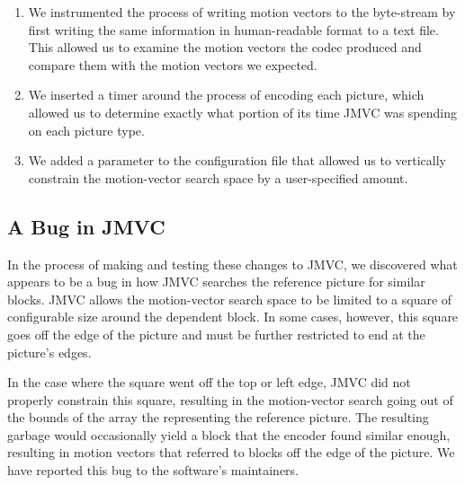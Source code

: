 \documentclass{sig-alternate-05-2015}
\begin{document}
\begin{enumerate}
\item We instrumented the process of writing motion vectors to the byte-stream
by first writing the same information in human-readable format to a text file.
This allowed us to examine the motion vectors the codec produced and compare
them with the motion vectors we expected.

\item We inserted a timer around the process of encoding each picture, which
allowed us to determine exactly what portion of its time JMVC was spending on
each picture type.

\item We added a parameter to the configuration file that allowed us to
vertically constrain the motion-vector search space by a user-specified amount.
\end{enumerate}

\subsection{A Bug in JMVC}
\label{subsec:bug}
In the process of making and testing these changes to JMVC, we discovered what
appears to be a bug in how JMVC searches the reference picture for similar
blocks. JMVC allows the motion-vector search space to be limited to a square of
configurable size around the dependent block. In some cases, however, this
square goes off the edge of the picture and must be further restricted to end
at the picture's edges.

In the case where the square went off the top or left edge, JMVC did not
properly constrain this square, resulting in the motion-vector search going out
of the bounds of the array the representing the reference picture. The
resulting garbage would occasionally yield a block that the encoder found
similar enough, resulting in motion vectors that referred to blocks off the
edge of the picture. We have reported this bug to the software's maintainers.
\end{document}

